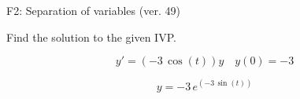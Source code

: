 \begin{exercise}
  \begin{exerciseTitle}F2: Separation of variables (ver. 49)\end{exerciseTitle}
  \begin{exerciseStatement}
    
Find the solution to the given IVP.

    
\[y'=( -3 \, \cos\left(t\right) )y\hspace{1em} y(0)= -3\]

  \end{exerciseStatement}
  \begin{exerciseAnswer}
    
\[y= -3 \, e^{\left(-3 \, \sin\left(t\right)\right)}\]

  \end{exerciseAnswer}
\end{exercise}
